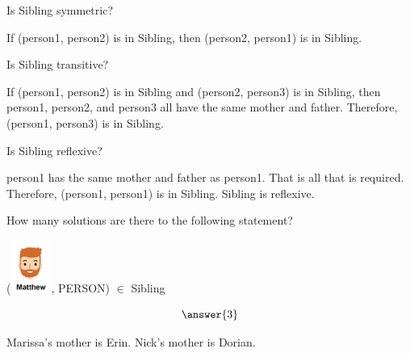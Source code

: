 \documentclass{ximera}
\begin{document}
\begin{exercise}
Is Sibling symmetric?

  \begin{multipleChoice}
  \end{multipleChoice}
  \begin{feedback}
If (person1, person2) is in Sibling, then (person2, person1) is in Sibling.
  \end{feedback}
\end{exercise}





\begin{exercise}
Is Sibling transitive?

  \begin{multipleChoice}
  \end{multipleChoice}
  \begin{feedback}
If (person1, person2) is in Sibling and (person2, person3) is in Sibling, then person1, person2, and person3 all have the same mother and father. Therefore, (person1, person3) is in Sibling.
  \end{feedback}
\end{exercise}




\begin{exercise}
Is Sibling reflexive?

  \begin{multipleChoice}
  \end{multipleChoice}
  \begin{feedback}
  person1 has the same mother and father as person1.  That is all that is required.  Therefore, (person1, person1) is in Sibling. Sibling is reflexive.
  \end{feedback}
\end{exercise}



\begin{exercise}
How many solutions are there to the following statement?  

({\includegraphics[width=50px,height=65px]{pics/people/matthew.png}}, PERSON) $\in$ Sibling 

\[  \answer{3} \]

  \begin{feedback}
Marissa's mother is Erin. Nick's mother is Dorian.
  \end{feedback}
\end{exercise}
\end{document}
